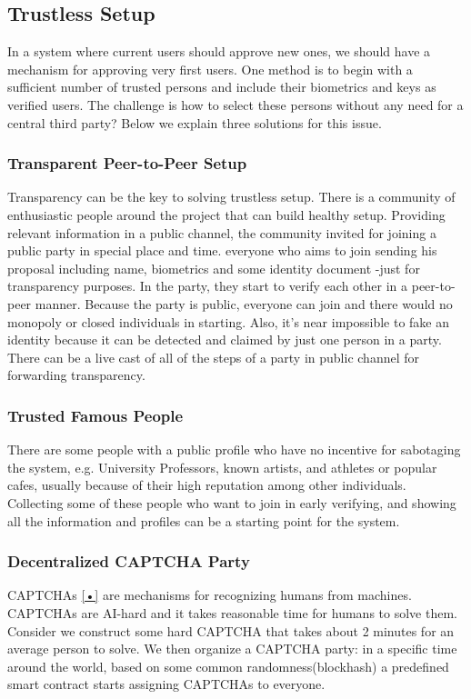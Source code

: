 \documentclass[conference]{IEEEtran}
\begin{document}
\subsection{Trustless Setup}
In a system where current users should approve new ones, we should have a mechanism for approving very first users. One method is to begin with a sufficient number of trusted persons and include their biometrics and keys as verified users. The challenge is how to select these persons without any need for a central third party? Below we explain three solutions for this issue.

\subsubsection*{Transparent Peer-to-Peer Setup} 
Transparency can be the key to solving trustless setup. There is a community of enthusiastic people around the project that can build healthy setup. Providing relevant information in a public channel, the community invited for joining a public party in special place and time. everyone who aims to join sending his proposal including name, biometrics and some identity document -just for transparency purposes. In the party, they start to verify each other in a peer-to-peer manner. Because the party is public, everyone can join and there would no monopoly or closed individuals in starting. Also, it's near impossible to fake an identity because it can be detected and claimed by just one person in a party. There can be a live cast of all of the steps of a party in public channel for forwarding transparency.

\subsubsection*{Trusted Famous People}
There are some people with a public profile who have no incentive for sabotaging the system, e.g. University Professors, known artists, and athletes or popular cafes, usually because of their high reputation among other individuals. Collecting some of these people who want to join in early verifying, and showing all the information and profiles can be a starting point for the system.

\subsubsection*{ Decentralized CAPTCHA Party}
CAPTCHAs {\ref{•}} are mechanisms for recognizing humans from machines. CAPTCHAs are AI-hard and it takes reasonable time for humans to solve them. Consider we construct some hard CAPTCHA that takes about 2 minutes for an average person to solve. We then organize a CAPTCHA party: in a specific time around the world, based on some common randomness(blockhash) a predefined smart contract starts assigning CAPTCHAs to everyone. 
\end{document}
